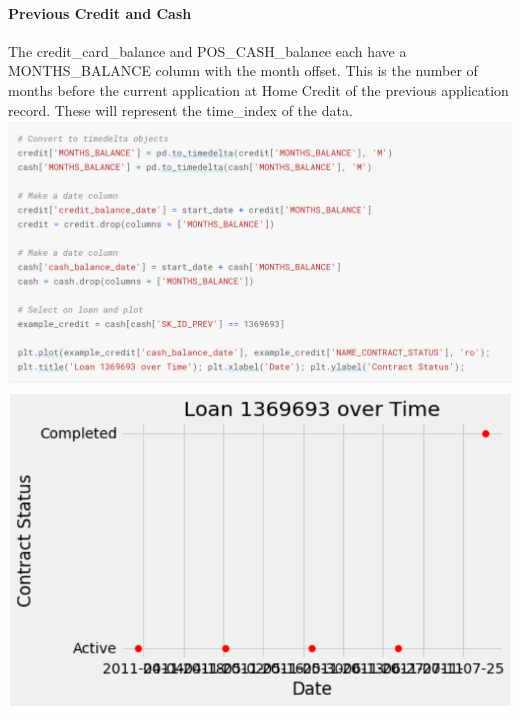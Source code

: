 \documentclass[twoside,a4paper]{article}
\begin{document}
\paragraph{Previous Credit and Cash}
The credit\_card\_balance and POS\_CASH\_balance each have a MONTHS\_BALANCE column with the month offset. This is the number of months before the current application at Home Credit of the previous application record. These will represent the time\_index of the data.\\
\includegraphics[scale=.8]{13.png}
\includegraphics[scale=.8]{14.png}
\end{document}
